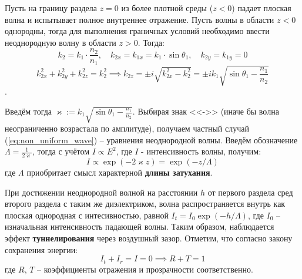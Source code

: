 \documentclass[12pt, a4paper]{article}
\begin{document}
Пусть на границу раздела $z=0$ из более плотной среды ($z<0$) падает плоская волна и испытывает 
полное внутреннее отражение. Пусть волны в области $z<0$ однородны, тогда для выполнения граничных условий
необходимо ввести неоднородную волну в области $z>0$. Тогда:
$$k_2 = k_1 \cdot \frac{n_2}{n_1},\quad k_{2x} = k_{1x} = k_1 \cdot \sin \theta_1,\quad k_{2y} = k_{1y} = 0 $$
$$k_{2x}^2 + k_{2y}^2 + k_{2z}^2 = k_2^2 \implies k_{2z} = \pm i \sqrt{k_{2x}^2 - k_{2}^2} = \pm ik_1\sqrt{\sin \theta_1 - \frac{n_1}{n_2}}$$.

Введём тогда $\varkappa := k_1 \sqrt{\sin \theta_1 - \frac{n_1}{n_2}}$. Выбирая знак <<->> (иначе бы волна неограниченно
возрастала по амплитуде), получаем частный случай (\ref{eq:non_uniform_wave}) -- уравнения неоднородной волны.
Введём обозначение $\Lambda = \frac{1}{2\varkappa}$, тогда с учётом $I\propto E^2$, где $I$ - интенсивность волны,
получим:
\begin{equation}
  I\propto \exp(-2\varkappa z) = \exp(-z/\Lambda)
  \label{eq:intensity_propto}
\end{equation}
где $\Lambda$ приобритает смысл характерной \textbf{длины затухания}.

При достижении неоднородной волной на расстоянии $h$ от первого раздела сред второго раздела с таким же диэлектриком,
волна распространяется внутрь как плоская однородная с интесивностью, равной $I_t = I_0 \exp(-h/\Lambda)$, где $I_0$ -- 
изначальная интенсивность падающей волны. Таким образом, наблюдается эффект \textbf{туннелирования} через воздушный зазор.
Отметим, что согласно закону сохранения энергии:
\begin{equation}
  I_t + I_r = I=0 \implies R+T = 1
  \label{eq:energy_conservation}
\end{equation}
где $R$, $T$ -- коэффициенты отражения и прозрачности соответственно.  
\end{document}
